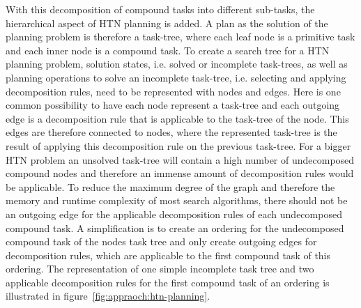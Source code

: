 With this decomposition of compound tasks into different sub-tasks, the hierarchical aspect of HTN planning is added.
A plan as the solution of the planning problem is therefore a task-tree, where each leaf node is a primitive task and each inner node is a compound task.
To create a search tree for a HTN planning problem, solution states, i.e. solved or incomplete task-trees, as well as planning operations to solve an incomplete task-tree, i.e. selecting and applying decomposition rules, need to be represented with nodes and edges.\newline
Here is one common possibility to have each node represent a task-tree and each outgoing edge is a decomposition rule that is applicable to the task-tree of the node.
This edges are therefore connected to nodes, where the represented task-tree is the result of applying this decomposition rule on the previous task-tree.
For a bigger HTN problem an unsolved task-tree will contain a high number of undecomposed compound nodes and therefore an immense amount of decomposition rules would be applicable.
To reduce the maximum degree of the graph and therefore the memory and runtime complexity of most search algorithms, there should not be an outgoing edge for the applicable decomposition rules of each undecomposed compound task.
A simplification is to create an ordering for the undecomposed compound task of the nodes task tree and only create outgoing edges for decomposition rules, which are applicable to the first compound task of this ordering.
The representation of one simple incomplete task tree and two applicable decomposition rules for the first compound task of an ordering is illustrated in figure~\ref{fig:appraoch:htn-planning}.

